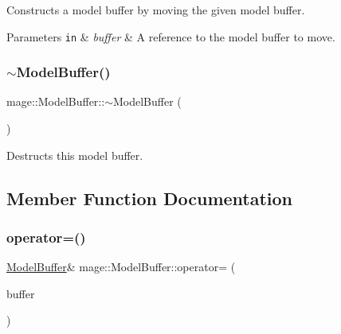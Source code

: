 Constructs a model buffer by moving the given model buffer.


\begin{DoxyParams}[1]{Parameters}
\mbox{\tt in}  & {\em buffer} & A reference to the model buffer to move. \\
\hline
\end{DoxyParams}
\hypertarget{structmage_1_1_model_buffer_a9536832e39a72cc597c41ca245eb52ba}{}\label{structmage_1_1_model_buffer_a9536832e39a72cc597c41ca245eb52ba} 
\subsubsection{\texorpdfstring{$\sim$\+Model\+Buffer()}{~ModelBuffer()}}
{\footnotesize\ttfamily mage\+::\+Model\+Buffer\+::$\sim$\+Model\+Buffer (\begin{DoxyParamCaption}{ }\end{DoxyParamCaption})\hspace{0.3cm}{\ttfamily [default]}}

Destructs this model buffer. 

\subsection{Member Function Documentation}
\hypertarget{structmage_1_1_model_buffer_a003f2105c63f3d7e735c1c00bab5fdee}{}\label{structmage_1_1_model_buffer_a003f2105c63f3d7e735c1c00bab5fdee} 
\subsubsection{\texorpdfstring{operator=()}{operator=()}\hspace{0.1cm}{\footnotesize\ttfamily [1/2]}}
{\footnotesize\ttfamily \hyperlink{structmage_1_1_model_buffer}{Model\+Buffer}\& mage\+::\+Model\+Buffer\+::operator= (\begin{DoxyParamCaption}\item[{const \hyperlink{structmage_1_1_model_buffer}{Model\+Buffer} \&}]{buffer }\end{DoxyParamCaption})\hspace{0.3cm}{\ttfamily [default]}}

